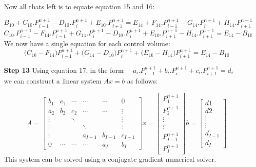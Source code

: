 \documentclass[11pt,letterpaper,titlepage]{article}
\begin{document}
\newpage
\noindent
Now all thats left is to equate equation 15 and 16:

\begin{equation*}
B_{10} + C_{10}. P_{i-1}^{n+1} - D_{10}. P_{i}^{n+1}+ E_{10}. P_{i+1}^{n+1}=E_{14} +F_{14}.P_{i-1}^{n+1} - G_{14}.P_{i}^{n+1} + H_{14}.P_{i+1}^{n+1} 
\end{equation*}
\begin{equation*}
C_{10}. P_{i-1}^{n+1} - F_{14}.P_{i-1}^{n+1} + G_{14}.P_{i}^{n+1} - D_{10}. P_{i}^{n+1}+ E_{10}. P_{i+1}^{n+1} - H_{14}.P_{i+1}^{n+1}=E_{14} - B_{10}
\end{equation*}
\newline
We now have a single equation for each control volume:
\begin{equation}
\biggr( C_{10}-F_{14} \biggr)P_{i-1}^{n+1}   + \biggr( G_{14} - D_{10} \biggr)P_{i}^{n+1}+ \biggr( E_{10} - H_{14} \biggr)P_{i+1}^{n+1} = E_{14} - B_{10}
\end{equation}









\vspace{0.5cm}\noindent
\textbf{Step 13}\newline
Using equation 17, in the form $\quad a_i.P_{i-1}^{n+1} + b_i.P_{i}^{n+1} + c_i.P_{i+1}^{n+1} = d_i \quad $ we can construct a linear system $Ax=b$ as follows:

\begin{equation*}
A=
\begin{bmatrix}
b_1    & c_1     & \cdots & \cdots & \cdots & 0      \\
a_2    & b_2     & c_2    & \cdots & \cdots & \vdots \\
\vdots &         & \ddots &        &        & \vdots \\
\vdots &         &        & \ddots &        & \vdots \\
\vdots &         &        &a_{I-1} &b_{I-1} &c_{I-1}  \\
0      & \cdots  & \cdots & \cdots & a_I    & b_I 
\end{bmatrix}
x=
\begin{bmatrix}
P_1^{n+1} \\
P_2^{n+1} \\
\vdots \\
\vdots \\
P_{I-1}^{n+1} \\
P_I^{n+1} 
\end{bmatrix}
b=
\begin{bmatrix}
d1 \\
d2 \\
\vdots \\
\vdots \\
d_{I-1}\\
d_I
\end{bmatrix}
\end{equation*}
\newline
This system can be solved using a conjugate gradient numerical solver.
\end{document}
